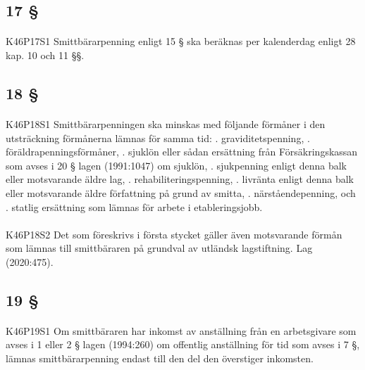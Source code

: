\documentclass[a4paper,notitlepage,openany,10pt]{book}
\begin{document}
\subsection*{17 §}
\paragraph*{}
{\tiny K46P17S1}
Smittbärarpenning enligt 15 § ska beräknas per kalenderdag enligt 28 kap. 10 och 11 §§.
\subsection*{18 §}
\paragraph*{}
{\tiny K46P18S1}
Smittbärarpenningen ska minskas med följande förmåner i den utsträckning förmånerna lämnas för samma tid:
. graviditetspenning,
. föräldrapenningsförmåner,
. sjuklön eller sådan ersättning från Försäkringskassan som avses i 20 § lagen (1991:1047) om sjuklön,
. sjukpenning enligt denna balk eller motsvarande äldre lag,
. rehabiliteringspenning,
. livränta enligt denna balk eller motsvarande äldre författning på grund av smitta,
. närståendepenning, och
. statlig ersättning som lämnas för arbete i etableringsjobb.
\paragraph*{}
{\tiny K46P18S2}
Det som föreskrivs i första stycket gäller även motsvarande förmån som lämnas till smittbäraren på grundval av utländsk lagstiftning.
Lag (2020:475).
\subsection*{19 §}
\paragraph*{}
{\tiny K46P19S1}
Om smittbäraren har inkomst av anställning från en arbetsgivare som avses i 1 eller 2 § lagen (1994:260) om offentlig anställning för tid som avses i 7 §, lämnas smittbärarpenning endast till den del den överstiger inkomsten.
\end{document}

